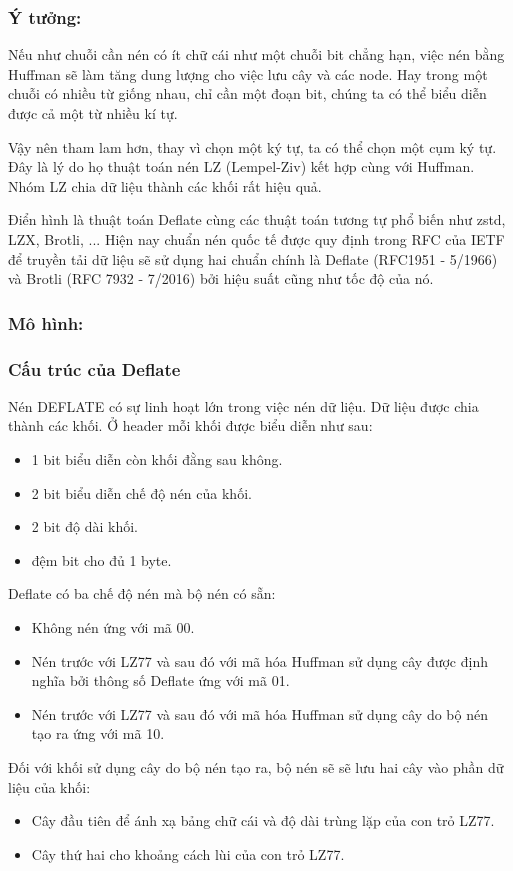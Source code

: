 \subsubsection{Ý tưởng:}

Nếu như chuỗi cần nén có ít chữ cái như một chuỗi bit chẳng hạn, việc nén bằng Huffman sẽ làm tăng dung lượng cho việc lưu cây và các node. Hay trong một chuỗi có nhiều từ giống nhau, chỉ cần một đoạn bit, chúng ta có thể biểu diễn được cả một từ nhiều kí tự.

Vậy nên tham lam hơn, thay vì chọn một ký tự, ta có thể chọn một cụm ký tự. Đây là lý do họ thuật toán nén LZ (Lempel-Ziv) kết hợp cùng với Huffman. Nhóm LZ chia dữ liệu thành các khối rất hiệu quả.

Điển hình là thuật toán Deflate cùng các thuật toán tương tự phổ biến như zstd, LZX, Brotli, ... Hiện nay chuẩn nén quốc tế được quy định trong RFC của IETF để truyền tải dữ liệu sẽ sử dụng hai chuẩn chính là Deflate (RFC1951 - 5/1966) và Brotli (RFC 7932 - 7/2016) bởi hiệu suất cũng như tốc độ của nó.

\subsubsection{Mô hình:}

\subsubsection{Cấu trúc của Deflate}
Nén DEFLATE có sự linh hoạt lớn trong việc nén dữ liệu. Dữ liệu được chia thành các khối. 
Ở header mỗi khối được biểu diễn như sau:
\begin{itemize}
    \item 1 bit biểu diễn còn khối đằng sau không.
    \item 2 bit biểu diễn chế độ nén của khối.
    \item 2 bit độ dài khối.
    \item đệm bit cho đủ 1 byte.
\end{itemize}
Deflate có ba chế độ nén mà bộ nén có sẵn:
\begin{itemize}
    \item Không nén ứng với mã 00.
    \item Nén trước với LZ77 và sau đó với mã hóa Huffman sử dụng cây được định nghĩa bởi thông số Deflate ứng với mã 01.
    \item Nén trước với LZ77 và sau đó với mã hóa Huffman sử dụng cây do bộ nén tạo ra ứng với mã 10.
\end{itemize}
Đối với khối sử dụng cây do bộ nén tạo ra, bộ nén sẽ sẽ lưu hai cây vào phần dữ liệu của khối:
\begin{itemize}
    \item Cây đầu tiên để ánh xạ bảng chữ cái và độ dài trùng lặp của con trỏ LZ77.
    \item Cây thứ hai cho khoảng cách lùi của con trỏ LZ77.
\end{itemize}
